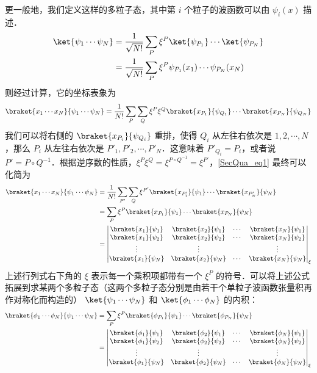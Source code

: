 更一般地，我们定义这样的多粒子态，其中第 $i$ 个粒子的波函数可以由 $\psi_i(x)$ 描述．
\begin{equation}
\begin{aligned}
\ket{\psi_1\cdots\psi_N}&=\frac{1}{\sqrt{N!}}\sum_P \xi^P\ket{\psi_{P_1}}\cdots \ket{\psi_{P_N}}\\
&=\frac{1}{\sqrt{N!}}\sum_P \xi^P\psi_{P_1}(x_1)\cdots \psi_{P_N}(x_N)
\end{aligned}
\end{equation}
则经过计算，它的坐标表象为
\begin{equation}\label{SecQua_eq1}
\braket{x_1\cdots x_N}{\psi_1\cdots\psi_N}=\frac{1}{N!}\sum_P\sum_Q \xi^P \xi^Q \braket{x_{P_1}}{\psi_{Q_1}}\cdots\braket{x_{P_N}}{\psi_{Q_N}}
\end{equation}
我们可以将右侧的 $\braket{x_{P_i}}{\psi_{Q_i}}$ 重排，使得 $Q_i$ 从左往右依次是 $1,2,\cdots,N$，那么 $P_i$ 从左往右依次是 $P'_1,P'_2,\cdots,P'_N$．这意味着 $P'_{Q_i}=P_i$，或者说 $P'=P\circ Q^{-1}$．根据逆序数的性质，$\xi^P\xi^Q=\xi^{P\circ Q^{-1}}=\xi^{P'}$，\autoref{SecQua_eq1}  最终可以化简为
\begin{equation}
\begin{aligned}
\braket{x_1\cdots x_N}{\psi_1\cdots\psi_N}&=\frac{1}{N!}\sum_{P'}\sum_Q \xi^{P'} \braket{x_{P'_1}}{\psi_{1}}\cdots\braket{x_{P'_N}}{\psi_{N}}\\
&=\sum_{P}\xi^P\braket{x_{P_1}}{\psi_{1}}\cdots\braket{x_{P_N}}{\psi_{N}}\\
&=\left|\begin{matrix}
\braket{x_1}{\psi_1} &\braket{x_2}{\psi_1} &\cdots &\braket{x_N}{\psi_1}\\
\braket{x_1}{\psi_2} &\braket{x_2}{\psi_2} &\cdots & \braket{x_N}{\psi_2}\\
\vdots & \vdots & & \vdots \\
\braket{x_1}{\psi_N} &\braket{x_2}{\psi_N} &\cdots & \braket{x_N}{\psi_N}
\end{matrix}\right|_\xi
\end{aligned}
\end{equation}
上述行列式右下角的 $\xi$ 表示每一个乘积项都带有一个 $\xi^P$ 的符号．可以将上述公式拓展到求某两个多粒子态（这两个多粒子态分别是由若干个单粒子波函数张量积再作对称化而构造的） $\ket{\psi_1\cdots\psi_N}$ 和 $\ket{\phi_1\cdots\phi_N}$ 的内积：
\begin{equation}
\begin{aligned}
\braket{\phi_1\cdots \phi_N}{\psi_1\cdots\psi_N}
&=\sum_{P}\xi^P\braket{\phi_{P_1}}{\psi_{1}}\cdots\braket{\phi_{P_N}}{\psi_{N}}\\
&=\left|\begin{matrix}
\braket{\phi_1}{\psi_1} &\braket{\phi_2}{\psi_1} &\cdots &\braket{\phi_N}{\psi_1}\\
\braket{\phi_1}{\psi_2} &\braket{\phi_2}{\psi_2} &\cdots & \braket{\phi_N}{\psi_2}\\
\vdots & \vdots & & \vdots \\
\braket{\phi_1}{\psi_N} &\braket{\phi_2}{\psi_N} &\cdots & \braket{\phi_N}{\psi_N}
\end{matrix}\right|_\xi
\end{aligned}
\end{equation}
